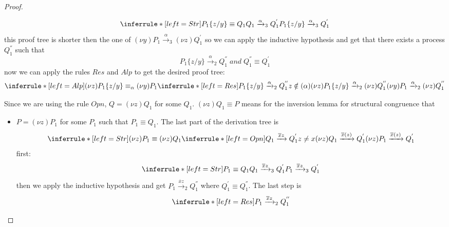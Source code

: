 \begin{theorem}
\begin{proof}
\begin{description}
\begin{description}
\begin{itemize}
			\[
			  \inferrule* [left=Str]{
			      P_{1}\{z/y\}\equiv Q_{1}
			    \\
			      Q_{1}\xrightarrow{\alpha}_{3}Q_{1}^{'}
			  }{
			    P_{1}\{z/y\}\xrightarrow{\alpha}_{3}Q_{1}^{'}
			  }
			\]
			this proof tree is shorter then the one of $(\nu y)P_{1}\xrightarrow{\alpha}_{3}(\nu z)Q_{1}^{'}$ so we can apply the inductive hypothesis and get that there exists a process $Q_{1}^{''}$ such that 
			\[
			  P_{1}\{z/y\}\xrightarrow{\alpha}_{2}Q_{1}^{''}\; and\; Q_{1}^{''}\equiv Q_{1}^{'}
			\]
			now we can apply the rules $Res$ and $Alp$ to get the desired proof tree:
			\[
			  \inferrule* [left=Alp]{
				(\nu z)P_{1}\{z/y\}\equiv_{\alpha} (\nu y)P_{1}
			      \\
				\inferrule* [left=Res]{
				    P_{1}\{z/y\}
				      \xrightarrow{\alpha}_{2}
					Q_{1}^{''}
				  \\
				    z\notin(\alpha)
				  }{
				    (\nu z)P_{1}\{z/y\}
				      \xrightarrow{\alpha}_{2}
					(\nu z)Q_{1}^{''}
				  }
			  }{
			    (\nu y)P_{1}\xrightarrow{\alpha}_{2}(\nu z)Q_{1}^{''}
			  }
			\]
                      \end{itemize}
		  \item[Opn]
		    Since we are using the rule $Opn$, $Q=(\nu z) Q_{1}$ for some $Q_{1}$. $(\nu z) Q_{1}\equiv P$ means for the inversion lemma for structural congruence that
		    \begin{itemize}
		      \item
			$P=(\nu z) P_{1}$ for some $P_{1}$ such that $P_{1}\equiv Q_{1}$. The last part of the derivation tree is 
			\[
			  \inferrule* [left=Str]{
			      (\nu z) P_{1}\equiv (\nu z) Q_{1}
			    \\
			      \inferrule* [left=Opn]{
				  Q_{1} \xrightarrow{\overline{x}z} Q_{1}^{'}
				\\
				  z\neq x
			      }{
				(\nu z) Q_{1} \xrightarrow{\overline{x}(z)} Q_{1}^{'}
			      }
			  }{
			    (\nu z) P_{1} \xrightarrow{\overline{x}(z)} Q_{1}^{'}
			  }
			\]
			first:
			\[
			      \inferrule* [left=Str]{
				  P_{1}\equiv Q_{1}
				\\
				  Q_{1}\xrightarrow{\overline{x}z}_{3}Q_{1}^{'}
			      }{
				P_{1}\xrightarrow{\overline{x}z}_{3}Q_{1}^{'}
			      }
			\]
			then we apply the inductive hypothesis and get $P_{1}\xrightarrow{\overline{x}z}_{2}Q_{1}^{''}$ where $Q_{1}^{'}\equiv Q_{1}^{''}$. The last step is 
			\[
			  \inferrule* [left=Res]{
			      P_{1}\xrightarrow{\overline{x}z}_{2}Q_{1}^{''}
			    \\
}\]
\end{itemize}
\end{description}
\end{description}
\end{proof}
\end{theorem}
